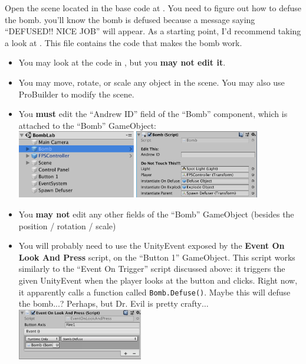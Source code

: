 \documentclass[11pt]{article}
\begin{document}
Open the scene located in the base code at .  You need to figure 
out how to defuse the bomb.  you'll know the bomb is defused because a message saying 
``DEFUSED!! NICE JOB'' will appear.  As a starting point, I'd recommend taking a look at 
.  This file contains the code that makes the bomb work.
\begin{itemize}
    \setlength\itemsep{0.25em}
    \item You may look at the code in , but you \textbf{may not edit it}.
    \item You may move, rotate, or scale any object in the scene.  You may also use ProBuilder to modify the scene.
    \item You \textbf{must} edit the ``Andrew ID'' field of the ``Bomb'' component, which is attached
          to the ``Bomb'' GameObject: \\ 
          \includegraphics[height=8em]{bomblab-2} \includegraphics[height=8em]{bomblab-3}
    \item You \textbf{may not} edit any other fields of the ``Bomb'' GameObject (besides the position /
          rotation / scale)
    \item You will probably need to use the UnityEvent exposed by the \textbf{Event On Look And Press}
          script, on the ``Button 1'' GameObject.  This script works similarly to the ``Event On Trigger''
          script discussed above: it triggers the given UnityEvent when the player looks at the button
          and clicks.  Right now, it apparently calls a function called \lstinline|Bomb.Defuse()|.
          Maybe this will defuse the bomb...?  Perhaps, but Dr. Evil is pretty crafty$\dots$\\
          \includegraphics[height=6em]{bomblab-4}
\end{itemize}
\end{document}
